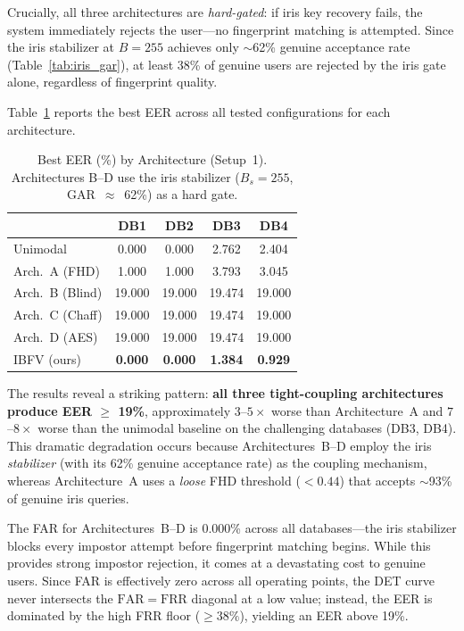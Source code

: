 \documentclass[conference]{IEEEtran}
\newcommand{\IBFV}{\textsf{IBFV}}
\newcommand{\FAR}{\mathrm{FAR}}
\newcommand{\FRR}{\mathrm{FRR}}
\begin{document}
Crucially, all three architectures are \emph{hard-gated}: if iris key recovery fails, the system immediately rejects the user---no fingerprint matching is attempted. Since the iris stabilizer at $B = 255$ achieves only $\sim$62\% genuine acceptance rate (Table~\ref{tab:iris_gar}), at least 38\% of genuine users are rejected by the iris gate alone, regardless of fingerprint quality.

Table~\ref{tab:arch_bcd} reports the best EER across all tested configurations for each architecture.

\begin{table}[t]
\centering
\caption{Best EER (\%) by Architecture (Setup~1). Architectures B--D use the iris stabilizer ($B_s = 255$, GAR~$\approx$~62\%) as a hard gate.}
\label{tab:arch_bcd}
\begin{tabular}{@{}l c c c c@{}}
\toprule
 & \textbf{DB1} & \textbf{DB2} & \textbf{DB3} & \textbf{DB4} \\
\midrule
Unimodal        & 0.000 & 0.000 & 2.762 & 2.404 \\
Arch.~A (FHD)   & 1.000 & 1.000 & 3.793 & 3.045 \\
Arch.~B (Blind) & 19.000 & 19.000 & 19.474 & 19.000 \\
Arch.~C (Chaff) & 19.000 & 19.000 & 19.474 & 19.000 \\
Arch.~D (AES)   & 19.000 & 19.000 & 19.474 & 19.000 \\
\IBFV{} (ours)  & \textbf{0.000} & \textbf{0.000} & \textbf{1.384} & \textbf{0.929} \\
\bottomrule
\end{tabular}
\end{table}

The results reveal a striking pattern: \textbf{all three tight-coupling architectures produce EER $\geq$ 19\%}, approximately $3$--$5\times$ worse than Architecture~A and $7$--$8\times$ worse than the unimodal baseline on the challenging databases (DB3, DB4). This dramatic degradation occurs because Architectures~B--D employ the iris \emph{stabilizer} (with its 62\% genuine acceptance rate) as the coupling mechanism, whereas Architecture~A uses a \emph{loose} FHD threshold ($< 0.44$) that accepts $\sim$93\% of genuine iris queries.

The FAR for Architectures~B--D is 0.000\% across all databases---the iris stabilizer blocks every impostor attempt before fingerprint matching begins. While this provides strong impostor rejection, it comes at a devastating cost to genuine users. Since FAR is effectively zero across all operating points, the DET curve never intersects the $\FAR = \FRR$ diagonal at a low value; instead, the EER is dominated by the high FRR floor ($\geq 38\%$), yielding an EER above 19\%.
\end{document}
